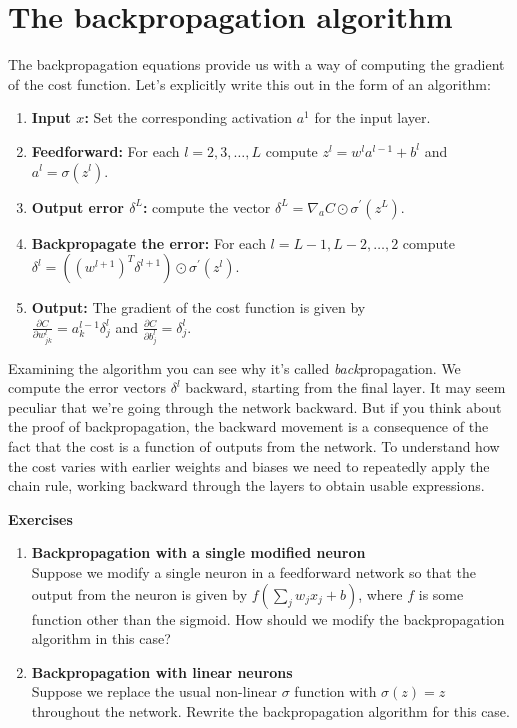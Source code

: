 \section{The backpropagation algorithm}
\label{sec:Thebackpropagationalgorithm}


The backpropagation equations provide us with a way of computing the gradient of the cost function. Let's explicitly write this out in the form of an algorithm: 
\begin{enumerate}
\item 
\textbf{Input $x$:} Set the corresponding activation $a^1$  for the input layer.

\item \textbf{Feedforward:} For each $l=2,3,\ldots,L$ compute $z^{l}=w^{l} a^{l-1}+b^{l}$ and $a^{l}=\sigma\left(z^{l}\right)$.

\item \textbf{Output error  $\delta^{L}$:} compute the vector $\delta^{L}=\nabla_{a} C \odot \sigma^{\prime}\left(z^{L}\right)$.

\item \textbf{Backpropagate the error:} For each $l=L-1,L-2,\ldots,2$ compute\\ $\delta^{l}=\left(\left(w^{l+1}\right)^{T} \delta^{l+1}\right) \odot \sigma^{\prime}\left(z^{l}\right)$.

\item \textbf{Output:} The gradient of the cost function is given by\\ $\frac{\partial C}{\partial w_{j k}^{l}}=a_{k}^{l-1} \delta_{j}^{l}$ and $\frac{\partial C}{\partial b_{j}^{l}}=\delta_{j}^{l}$.

\end{enumerate}
 

Examining the algorithm you can see why it's called \textit{back}propagation. We compute the error vectors $\delta^{l}$
backward, starting from the final layer. It may seem peculiar that we're going through the network backward. But if you think about the proof of backpropagation, the backward movement is a consequence of the fact that the cost is a function of outputs from the network. To understand how the cost varies with earlier weights and biases we need to repeatedly apply the chain rule, working backward through the layers to obtain usable expressions.


\textbf{Exercises}
\begin{enumerate}
\item
\textbf{Backpropagation with a single modified neuron}\\
 Suppose we modify a single neuron in a feedforward network so that the output from the neuron is given by $f\left(\sum_{j} w_{j} x_{j}+b\right)$, where $f$  is some function other than the sigmoid. How should we modify the backpropagation algorithm in this case?
\item
\textbf{Backpropagation with linear neurons}\\
Suppose we replace the usual non-linear $\sigma$ function with $\sigma(z)=z$  throughout the network. Rewrite the backpropagation algorithm for this case. 
\end{enumerate}

